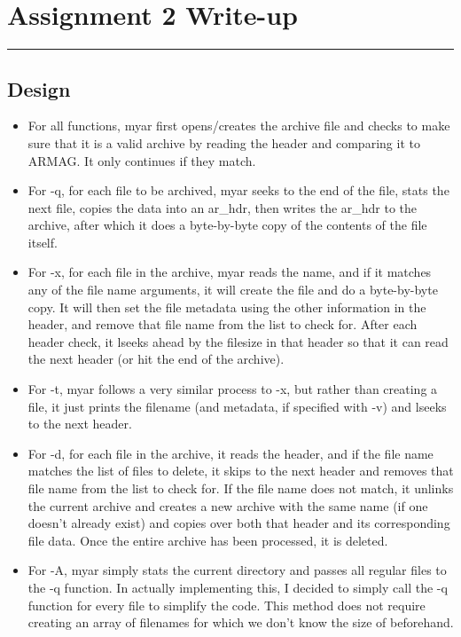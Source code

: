 \documentclass[letterpaper,10pt,fleqn]{article}
\numberwithin{equation}{section}
\begin{document}

\section*{Assignment 2 Write-up}
\hrule

\subsection*{Design}
\begin{itemize}
        \item For all functions, myar first opens/creates the archive file and checks to make sure that it is a valid archive by reading the header and comparing it to ARMAG.  It only continues if they match.
        \item For -q, for each file to be archived, myar seeks to the end of the file, stats the next file, copies the data into an ar\_hdr, then writes the ar\_hdr to the archive, after which it does a byte-by-byte copy of the contents of the file itself.
        \item For -x, for each file in the archive, myar reads the name, and if it matches any of the file name arguments, it will create the file and do a byte-by-byte copy.  It will then set the file metadata using the other information in the header, and remove that file name from the list to check for.  After each header check, it lseeks ahead by the filesize in that header so that it can read the next header (or hit the end of the archive).
        \item For -t, myar follows a very similar process to -x, but rather than creating a file, it just prints the filename (and metadata, if specified with -v) and lseeks to the next header.
        \item For -d, for each file in the archive, it reads the header, and if the file name matches the list of files to delete, it skips to the next header and removes that file name from the list to check for.  If the file name does not match, it unlinks the current archive and creates a new archive with the same name (if one doesn't already exist) and copies over both that header and its corresponding file data.  Once the entire archive has been processed, it is deleted.
        \item For -A, myar simply stats the current directory and passes all regular files to the -q function.  In actually implementing this, I decided to simply call the -q function for every file to simplify the code.  This method does not require creating an array of filenames for which we don't know the size of beforehand.

\end{itemize}
\end{document}

